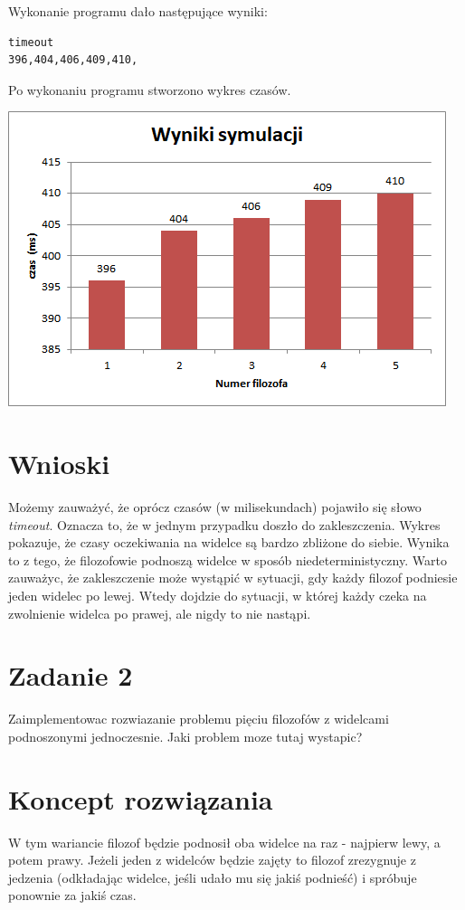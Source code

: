 \documentclass[12pt]{article}
\begin{document}
\newpage
\noindent
Wykonanie programu dało następujące wyniki:
\begin{verbatim}
timeout
396,404,406,409,410,
\end{verbatim}

\noindent
Po wykonaniu programu stworzono wykres czasów.
\begin{center}
\centering
    \includegraphics{philosophers_deadlock.png}
\end{center}


\section{Wnioski}
Możemy zauważyć, że oprócz czasów (w milisekundach) pojawiło się słowo \emph{timeout}. Oznacza to, że w jednym przypadku doszło do zakleszczenia. Wykres pokazuje, że czasy oczekiwania na widelce są bardzo zbliżone do siebie. Wynika to z tego, że filozofowie podnoszą widelce w sposób niedeterministyczny.
Warto zauważyc, że zakleszczenie może wystąpić w sytuacji, gdy każdy filozof podniesie jeden widelec po lewej. Wtedy dojdzie do sytuacji, w której każdy czeka na zwolnienie widelca po prawej, ale nigdy to nie nastąpi.



\newpage
\section{Zadanie 2}
Zaimplementowac rozwiazanie problemu pięciu filozofów z widelcami podnoszonymi jednoczesnie. Jaki problem moze tutaj wystapic?
  
\section{Koncept rozwiązania}
W tym wariancie filozof będzie podnosił oba widelce na raz - najpierw lewy, a potem prawy. Jeżeli jeden z widelców będzie zajęty to filozof zrezygnuje z jedzenia (odkładając widelce, jeśli udało mu się jakiś podnieść) i spróbuje ponownie za jakiś czas.
\end{document}
